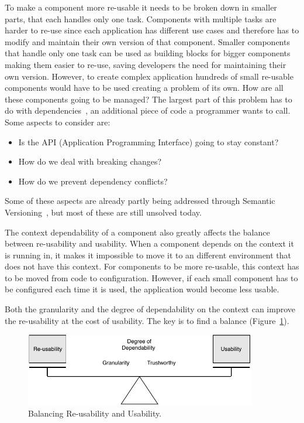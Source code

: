 To make a component more re-usable it needs to be broken down in smaller parts, that each handles only one task. Components with multiple tasks are harder to re-use since each application has different use cases and therefore has to modify and maintain their own version of that component. Smaller components that handle only one task can be used as building blocks for bigger components making them easier to re-use, saving developers the need for maintaining their own version. However, to create complex application hundreds of small re-usable components would have to be used creating a problem of its own. How are all these components going to be managed? The largest part of this problem has to do with dependencies~\cite{reusedreamdead}, an additional piece of code a programmer wants to call. Some aspects to consider are:
\begin{itemize}
	\item Is the API (Application Programming Interface) going to stay constant?
	\item How do we deal with breaking changes?
	\item How do we prevent dependency conflicts?
\end{itemize}

\noindent Some of these aspects are already partly being addressed through Semantic Versioning~\cite{preston2013semantic}, but most of these are still unsolved today.

The context dependability of a component also greatly affects the balance between re-usability and usability. When a component depends on the context it is running in, it makes it impossible to move it to an different environment that does not have this context. For components to be more re-usable, this context has to be moved from code to configuration. However, if each small component has to be configured each time it is used, the application would become less usable.

Both the granularity and the degree of dependability on the context can improve the re-usability at the cost of usability. The key is to find a balance (Figure~\ref{fig:balance-scale}). 

\vspace{0.5cm}

\begin{figure}[h]
	\centering
	\includegraphics[width=0.9\textwidth]{images/intro-balance-scale.pdf}
	\caption{\label{fig:balance-scale} Balancing Re-usability and Usability.}
\end{figure}

